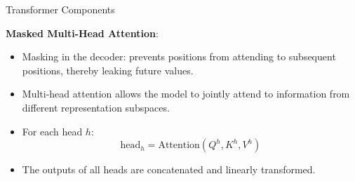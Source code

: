 \documentclass[11pt,compress,t,notes=noshow, xcolor=table]{beamer}
\begin{document}
\begin{vbframe}{Transformer Components}
  \framebreak

\textbf{Masked Multi-Head Attention}:
  \begin{itemize}
    \item Masking in the decoder: prevents positions from attending to subsequent positions, thereby leaking future values.
    \item Multi-head attention allows the model to jointly attend to information from different representation subspaces.
    \item For each head \( h \):
        \[
        \text{head}_h = \text{Attention}(Q^h, K^h, V^h)
        \]
    \item The outputs of all heads are concatenated and linearly transformed.
  \end{itemize}
  
\end{vbframe}







%
%
\end{document}
